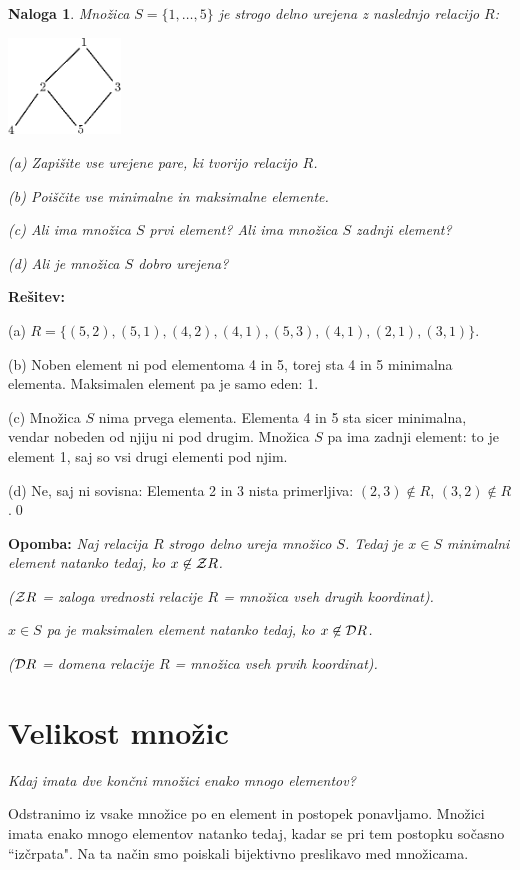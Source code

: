 \documentclass[11pt,paper=b5,footinclude,headinclude]{scrbook} %
\newtheorem*{problem}{Naloga}
\begin{document}
\begin{problem}
Množica $S=\{1,\ldots,5\}$ je strogo delno urejena z naslednjo relacijo $R$:
\begin{center}
\includegraphics[width=30mm]{hasse5.eps}
\end{center}

(a) Zapišite vse urejene pare, ki tvorijo relacijo $R$.

(b) Poiščite vse minimalne in maksimalne elemente.

(c) Ali ima množica $S$ prvi element? Ali ima množica $S$ zadnji element?

(d) Ali je množica $S$ dobro urejena?
\end{problem}

\textbf{Rešitev:}

(a) $R = \{(5,2),(5,1),(4,2),(4,1),(5,3),(4,1),(2,1),(3,1)\}$.

(b) Noben element ni pod elementoma 4 in 5, torej sta 4 in 5 minimalna elementa.
Maksimalen element pa je samo eden: 1.

(c) Množica $S$ nima prvega elementa. Elementa 4 in 5 sta sicer minimalna, vendar nobeden
od njiju ni pod drugim. Množica $S$ pa ima zadnji element: to je element 1, saj so vsi drugi elementi
pod njim.

(d) Ne, saj ni sovisna: Elementa 2 in 3 nista primerljiva: $(2,3)\not\in R$, $(3,2)\not\in R$.\qed

\bigskip
\textbf{Opomba:} \emph{Naj relacija $R$ strogo delno ureja množico $S$.
Tedaj je $x\in S$ minimalni element natanko tedaj, ko $x\not\in {\cal Z}R$.}

\emph{(${\cal Z}R$ = zaloga vrednosti relacije $R$ = množica vseh drugih koordinat).}

\emph{$x\in S$ pa je maksimalen element natanko tedaj, ko $x\not\in {\cal D}R$.}

\emph{(${\cal D}R$ = domena relacije $R$ = množica vseh prvih koordinat).}

\chapter{Velikost množic}
{\em Kdaj imata dve končni množici enako mnogo elementov?

Odstranimo iz vsake množice po en element in postopek ponavljamo. Množici
imata enako mnogo elementov natanko tedaj, kadar se pri tem postopku sočasno ``izčrpata".
Na ta način smo poiskali bijektivno preslikavo med množicama.}
\end{document}
